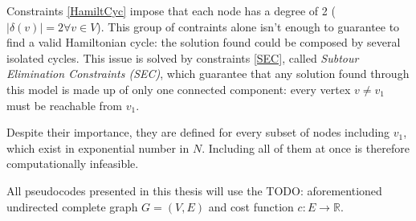 Constraints \ref{HamiltCyc} impose that each node has a degree of 2 ($|\delta(v)| = 2 \forall v\in V$). This group of contraints alone isn't enough to guarantee to find a valid Hamiltonian cycle: the solution found could be composed by several isolated cycles. This issue is solved by constraints \ref{SEC}, called \textit{Subtour Elimination Constraints (SEC)}, which guarantee that any solution found through this model is made up of only one connected component: every vertex $v\neq v_1$ must be reachable from $v_1$.

Despite their importance, they are defined for every subset of nodes including $v_1$, which exist in exponential number in $N$. Including all of them at once is therefore computationally infeasible.

All pseudocodes presented in this thesis will use the
TODO: aforementioned
undirected complete graph $G=(V,E)$ and cost function $c:E\rightarrow\mathbb{R}$.